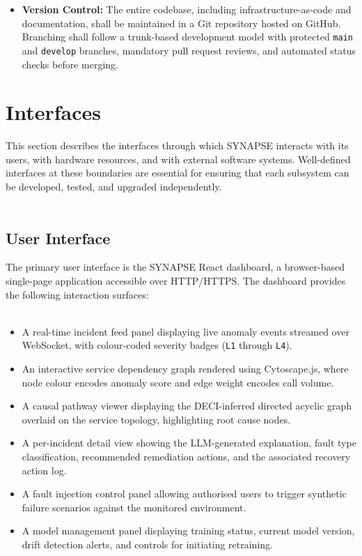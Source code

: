 \begin{itemize}
    \item \textbf{Version Control:} The entire codebase, including infrastructure-as-code and documentation, shall be maintained in a Git repository hosted on GitHub. Branching shall follow a trunk-based development model with protected \texttt{main} and \texttt{develop} branches, mandatory pull request reviews, and automated status checks before merging.

\end{itemize}

\section{Interfaces}

\hspace*{0.3in} This section describes the interfaces through which SYNAPSE interacts with its users, with hardware resources, and with external software systems. Well-defined interfaces at these boundaries are essential for ensuring that each subsystem can be developed, tested, and upgraded independently.\\\\

\subsection{User Interface}

\hspace*{0.3in} The primary user interface is the SYNAPSE React dashboard, a browser-based single-page application accessible over HTTP/HTTPS. The dashboard provides the following interaction surfaces:\\\\

\begin{itemize}
    \item A real-time incident feed panel displaying live anomaly events streamed over WebSocket, with colour-coded severity badges (\texttt{L1} through \texttt{L4}).
    \item An interactive service dependency graph rendered using Cytoscape.js, where node colour encodes anomaly score and edge weight encodes call volume.
    \item A causal pathway viewer displaying the DECI-inferred directed acyclic graph overlaid on the service topology, highlighting root cause nodes.
    \item A per-incident detail view showing the LLM-generated explanation, fault type classification, recommended remediation actions, and the associated recovery action log.
    \item A fault injection control panel allowing authorised users to trigger synthetic failure scenarios against the monitored environment.
    \item A model management panel displaying training status, current model version, drift detection alerts, and controls for initiating retraining.
\end{itemize}

